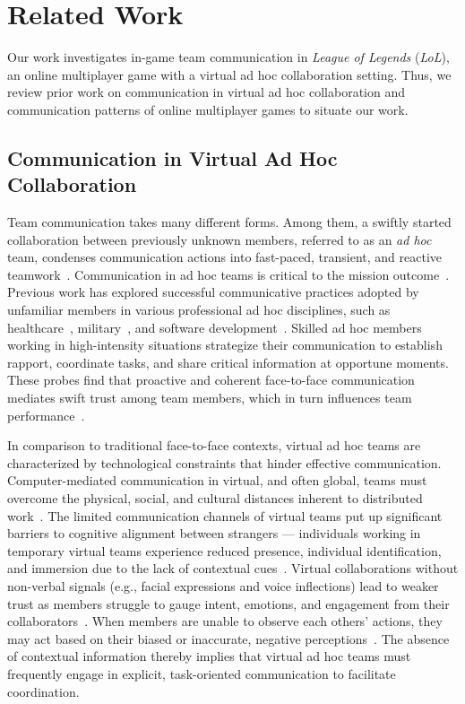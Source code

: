 \section{Related Work}
Our work investigates in-game team communication in \textit{League of Legends} (\textit{LoL}), an online multiplayer game with a virtual ad hoc collaboration setting. Thus, we review prior work on communication in virtual ad hoc collaboration and communication patterns of online multiplayer games to situate our work.


\subsection{Communication in Virtual Ad Hoc Collaboration}
Team communication takes many different forms. Among them, a swiftly started collaboration between previously unknown members, referred to as an \textit{ad hoc} team, condenses communication actions into fast-paced, transient, and reactive teamwork~\cite{finholt1990}. Communication in ad hoc teams is critical to the mission outcome~\cite{white2018, jarvenpaa1998, mesmer2009}. Previous work has explored successful communicative practices adopted by unfamiliar members in various professional ad hoc disciplines, such as healthcare~\cite{roberts2014, chalupnik2020, evans2021}, military~\cite{pascual1999, capiola2020}, and software development~\cite{cherry2008}. Skilled ad hoc members working in high-intensity situations strategize their communication to establish rapport, coordinate tasks, and share critical information at opportune moments. These probes find that proactive and coherent face-to-face communication mediates swift trust among team members, which in turn influences team performance~\cite{capiola2020, strater2008}.

In comparison to traditional face-to-face contexts, virtual ad hoc teams are characterized by technological constraints that hinder effective communication. Computer-mediated communication in virtual, and often global, teams must overcome the physical, social, and cultural distances inherent to distributed work~\cite{oleary2007, morrison2020}. The limited communication channels of virtual teams put up significant barriers to cognitive alignment between strangers --- individuals working in temporary virtual teams experience reduced presence, individual identification, and immersion due to the lack of contextual cues~\cite{altschuller2013, altschuller2010}. Virtual collaborations without non-verbal signals (e.g., facial expressions and voice inflections) lead to weaker trust as members struggle to gauge intent, emotions, and engagement from their collaborators~\cite{morrison2020}. When members are unable to observe each others' actions, they may act based on their biased or inaccurate, negative perceptions~\cite{penarroja2013}. The absence of contextual information thereby implies that virtual ad hoc teams must frequently engage in explicit, task-oriented communication to facilitate coordination.

